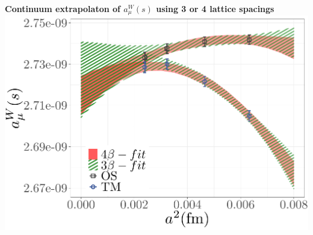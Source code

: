 \documentclass[a0,portrait]{a0poster}
\begin{document}
\begin{multicols}{2}
\begin{minipage}{0.52\linewidth}
\begin{center}
        \textbf{Continuum extrapolaton of $a_\mu^W(s)$ using 3 or 4 lattice spacings}
        \includegraphics[width=\linewidth]{amu_s_W_a4}
      \end{center}
    \end{minipage}


\end{multicols}
\end{document}
